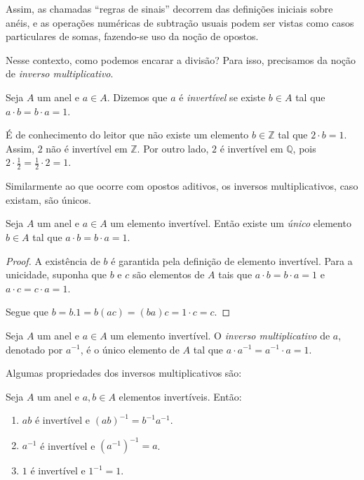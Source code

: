 Assim, as chamadas ``regras de sinais'' decorrem das definições iniciais sobre anéis, e as operações numéricas de subtração usuais podem ser vistas como casos particulares de somas, fazendo-se uso da noção de opostos.

Nesse contexto, como podemos encarar a divisão?
Para isso, precisamos da noção de \emph{inverso multiplicativo}.

\begin{definition}
    Seja $A$ um anel e $a \in A$.
    Dizemos que $a$ é \emph{invertível} se existe $b \in A$ tal que $a\cdot b=b\cdot a=1$.
\end{definition}

É de conhecimento do leitor que não existe um elemento $b \in \mathbb{Z}$ tal que $2\cdot b=1$.
Assim, $2$ não é invertível em $\mathbb{Z}$.
Por outro lado, $2$ é invertível em $\mathbb{Q}$, pois $2\cdot \frac{1}{2}=\frac{1}{2}\cdot 2=1$.

Similarmente ao que ocorre com opostos aditivos, os inversos multiplicativos, caso existam, são únicos.

\begin{proposition}
    Seja $A$ um anel e $a \in A$ um elemento invertível.
    Então existe um \emph{único} elemento $b \in A$ tal que $a\cdot b=b\cdot a=1$.
\end{proposition}
\begin{proof}
    A existência de $b$ é garantida pela definição de elemento invertível.
    Para a unicidade, suponha que $b$ e $c$ são elementos de $A$ tais que $a\cdot b=b\cdot a=1$ e $a\cdot c=c\cdot a=1$.

    Segue que $b=b.1=b(ac)=(ba)c=1\cdot c=c$.
\end{proof}

\begin{definition}
    Seja $A$ um anel e $a \in A$ um elemento invertível.
    O \emph{inverso multiplicativo} de $a$, denotado por $a^{-1}$, é o único elemento de $A$ tal que $a\cdot a^{-1}=a^{-1}\cdot a=1$.
\end{definition}

Algumas propriedades dos inversos multiplicativos são:

\begin{proposition}
    Seja $A$ um anel e $a, b \in A$ elementos invertíveis. Então:
    \begin{enumerate}[label=(\roman*)]
        \item $ab$ é invertível e $(ab)^{-1}=b^{-1}a^{-1}$.
        \item $a^{-1}$ é invertível e $(a^{-1})^{-1}=a$.
        \item $1$ é invertível e $1^{-1}=1$.
    \end{enumerate}
\end{proposition}

